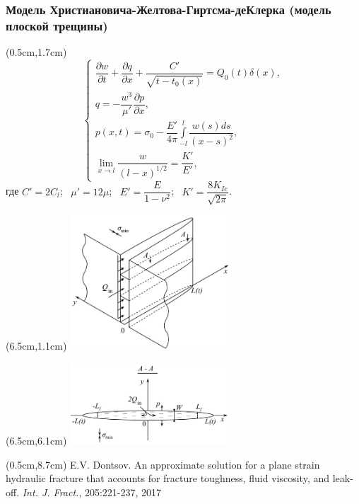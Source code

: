 \documentclass{beamer}
\begin{document}
\begin{frame}
\frametitle{Модель Христиановича-Желтова-Гиртсма-деКлерка (модель плоской трещины)}

\footnotesize

\begin{textblock*}{6cm}(0.5cm,1.7cm)
$$
\begin{cases}
\dfrac{\partial w}{\partial t}+\dfrac{\partial q}{\partial x}+\dfrac{C'}{\sqrt{t-t_0(x)}}=Q_0(t)\delta(x),\\[15pt]
q=-\dfrac{w^3}{\mu'}\dfrac{\partial p}{\partial x},\\[5pt]
p(x,t)=\sigma_0-\dfrac{E'}{4\pi}\displaystyle\int\limits_{-l}^{l}\dfrac{w(s)ds}{(x-s)^2},\\[20pt]
\displaystyle\lim_{x\to l}\dfrac{w}{(l-x)^{1/2}}=\dfrac{K'}{E'},
\end{cases}
$$
где $C'=2C_l$; $\,\,\,\mu'=12\mu$; $\,\,\,E'=\dfrac{E}{1-\nu^2}$; $\,\,\,K'=\dfrac{8K_{Ic}}{\sqrt{2\pi}}$.
\end{textblock*}

\begin{textblock*}{8cm}(6.5cm,1.1cm)
\includegraphics[width=6cm]{kgd_model_3D.jpg}
\end{textblock*}

\begin{textblock*}{8cm}(6.5cm,6.1cm)
\includegraphics[width=6cm]{kgd_model_A-A_plane.jpg}
\end{textblock*}

\begin{textblock*}{6cm}(0.5cm,8.7cm)
\tiny
\textcolor{lit_gray}{E.V. Dontsov. An approximate solution for a plane strain hydraulic fracture that accounts for fracture toughness, fluid viscosity, and leak-off. \emph{Int. J. Fract.}, 205:221-237, 2017}
\end{textblock*}

\normalsize

\end{frame}
\end{document}

